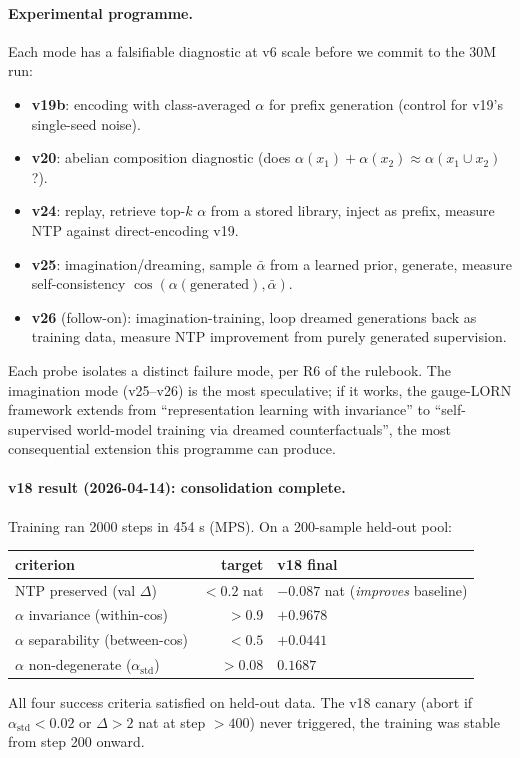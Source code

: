 \documentclass[11pt, a4paper]{article}
\theoremstyle{plain}
\theoremstyle{definition}
\theoremstyle{remark}
\begin{document}
\paragraph{Experimental programme.}
Each mode has a falsifiable diagnostic at v6 scale before we commit to the 30M run:
\begin{itemize}[nosep,leftmargin=2em]
\item \textbf{v19b}: encoding with class-averaged $\alpha$ for prefix generation (control for v19's single-seed noise).
\item \textbf{v20}: abelian composition diagnostic (does $\alpha(x_1) + \alpha(x_2) \approx \alpha(x_1 \cup x_2)$?).
\item \textbf{v24}: replay, retrieve top-$k$ $\alpha$ from a stored library, inject as prefix, measure NTP against direct-encoding v19.
\item \textbf{v25}: imagination/dreaming, sample $\bar\alpha$ from a learned prior, generate, measure self-consistency $\cos(\alpha(\mathrm{generated}), \bar\alpha)$.
\item \textbf{v26} (follow-on): imagination-training, loop dreamed generations back as training data, measure NTP improvement from purely generated supervision.
\end{itemize}

Each probe isolates a distinct failure mode, per R6 of the rulebook.
The imagination mode (v25--v26) is the most speculative; if it works, the gauge-LORN framework extends from ``representation learning with invariance'' to ``self-supervised world-model training via dreamed counterfactuals'', the most consequential extension this programme can produce.

\paragraph{v18 result (2026-04-14): consolidation complete.}
Training ran 2000 steps in 454 s (MPS).
On a 200-sample held-out pool:
\begin{center}
\small
\begin{tabular}{lrl}
\toprule
criterion & target & v18 final \\
\midrule
NTP preserved (val $\Delta$)                & $< 0.2$ nat      & $\boldsymbol{-0.087}$ nat (\emph{improves} baseline) \\
$\alpha$ invariance (within-cos)            & $> 0.9$          & $\boldsymbol{+0.9678}$ \\
$\alpha$ separability (between-cos)         & $< 0.5$          & $\boldsymbol{+0.0441}$ \\
$\alpha$ non-degenerate ($\alpha_{\mathrm{std}}$) & $> 0.08$    & $\boldsymbol{0.1687}$ \\
\bottomrule
\end{tabular}
\end{center}
All four success criteria satisfied on held-out data.
The v18 canary (abort if $\alpha_{\mathrm{std}} < 0.02$ or $\Delta > 2$ nat at step $> 400$) never triggered, the training was stable from step 200 onward.
\end{document}
